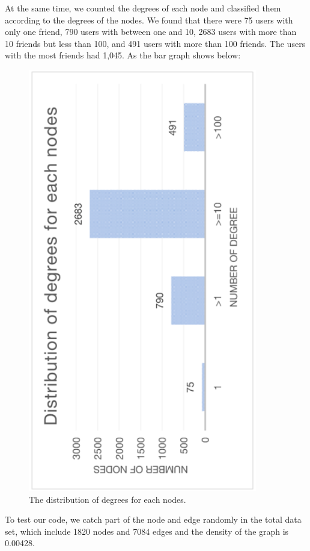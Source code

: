 \documentclass{article}
\begin{document}
At the same time, we counted the degrees of each node and classified them according to the degrees of the nodes. We found that there were 75 users with only one friend, 790 users with between one and 10, 2683 users with more than 10 friends but less than 100, and 491 users with more than 100 friends. The users with the most friends had 1,045. As the bar graph shows below:
\\
\begin{figure}[h!]
	\includegraphics[width=10cm]{images/distribution.png}
	\centering
	\caption{The distribution of  degrees for each nodes.}\label{dis}
\end{figure}

To test our code, we catch part of the node and edge randomly in the total data set, which include 1820 nodes and 7084 edges and the density of the graph is 0.00428.\\ 
\end{document}
